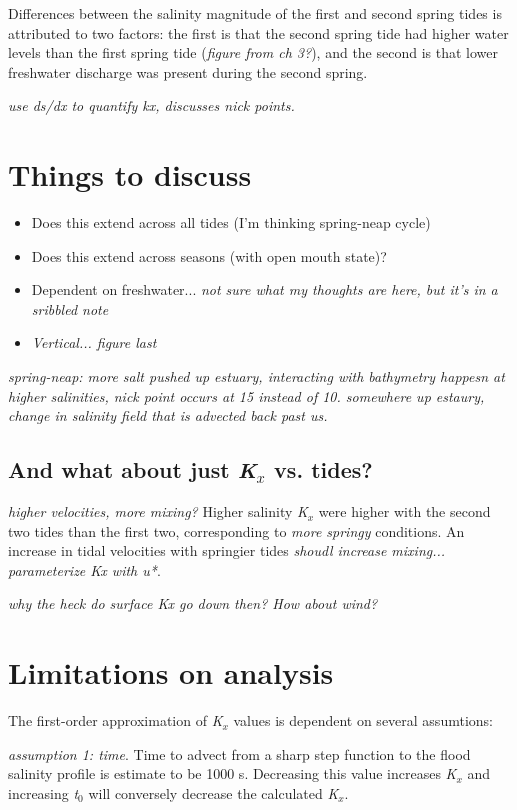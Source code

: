 Differences between the salinity magnitude of the first and second spring tides is attributed to two factors: the first is that the second spring tide had higher water levels than the first spring tide (\emph{figure from ch 3?}), and the second is that lower freshwater discharge was present during the second spring. 



\emph{use ds/dx to quantify kx, discusses nick points.}
\section{Things to discuss}
\begin{itemize}
	\item Does this extend across all tides (I'm thinking spring-neap cycle)
	\item Does this extend across seasons (with open mouth state)?
	\item Dependent on freshwater... \emph{not sure what my thoughts are here, but it's in a sribbled note}
	\item \emph{Vertical... figure last}
\end{itemize}



\emph{spring-neap:
more salt pushed up estuary, interacting with bathymetry happesn at higher salinities, nick point occurs at 15 instead of 10. somewhere up estaury, change in salinity field that is advected back past us. }

\subsection{And what about just \emph{K$_x$} vs. tides?}
\emph{higher velocities, more mixing?}
Higher salinity \emph{K$_x$} were higher with the second two tides than the first two, corresponding to \emph{more springy} conditions. An increase in tidal velocities with springier tides \emph{shoudl increase mixing... parameterize Kx with u*}. 

\emph{why the heck do surface Kx go down then? How about wind?}

\section{Limitations on analysis}

The first-order approximation of \emph{K$_x$} values is dependent on several assumtions: 

\emph{assumption 1: time}. Time to advect from a sharp step function to the flood salinity profile is estimate to be 1000 s. Decreasing this value increases \emph{K$_x$} and increasing \emph{t$_0$} will conversely decrease the calculated \emph{K$_x$}. 

